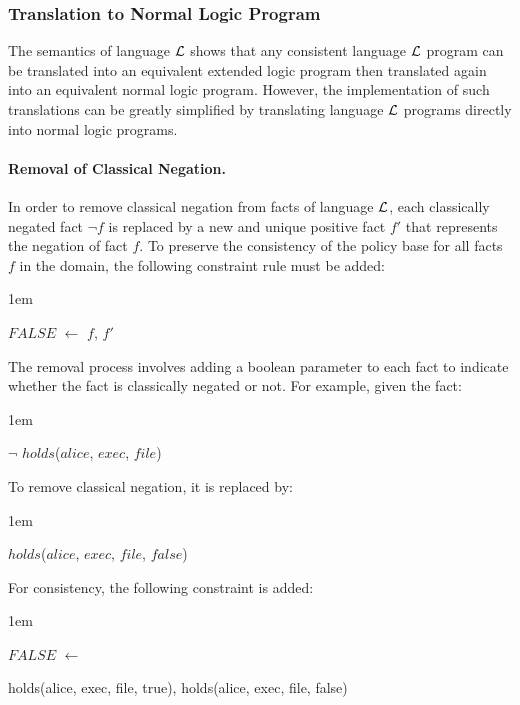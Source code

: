 \documentclass[global,twocolumn,final]{svjour}
\newenvironment{vquote}
  {\begin{list}{}{\leftmargin 1em}\item[]}
  {\end{list}}
\begin{document}
      \subsubsection{Translation to Normal Logic Program}

        The semantics of language ${\cal L}$ shows that any consistent language
        ${\cal L}$ program can be translated into an equivalent extended logic
        program then translated again into an equivalent normal logic program.
        However, the implementation of such translations can be greatly
        simplified by translating language ${\cal L}$ programs directly into
        normal logic programs.

        \paragraph{Removal of Classical Negation.}

          In order to remove classical negation from facts of language
          ${\cal L}$, each classically negated fact $\lnot$$f$ is replaced by
          a new and unique positive fact $f'$ that represents the negation of
          fact $f$. To preserve the consistency of the policy base for all
          facts $f$ in the domain, the following constraint rule must be added:

          \begin{vquote}
            $FALSE$ $\leftarrow$ $f$, $f'$
          \end{vquote}

          The removal process involves adding a boolean parameter to each fact
          to indicate whether the fact is classically negated or not. For
          example, given the fact:

          \begin{vquote}
            $\lnot$ $holds$($alice$, $exec$, $file$)
          \end{vquote}

          To remove classical negation, it is replaced by:

          \begin{vquote}
            $holds$($alice$, $exec$, $file$, $false$)
          \end{vquote}

          For consistency, the following constraint is added:

          \begin{vquote}
            $FALSE$ $\leftarrow$

            \hspace{1em}
            holds(alice, exec, file, true),
            holds(alice, exec, file, false)
          \end{vquote}
\end{document}

